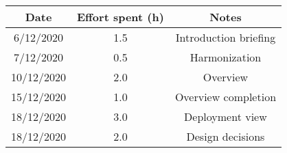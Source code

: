 \documentclass[../../main.tex]{subfiles}
\begin{document}
    \begin{center}
        \begin{tabular}{|c| |c| |c|} 
            \hline
            Date & Effort spent (h) & Notes\\ [0.5ex] 
            \hline\hline
            6/12/2020 & 1.5 & Introduction briefing\\ 
            7/12/2020 & 0.5 & Harmonization\\
            10/12/2020 & 2.0 & Overview\\
            15/12/2020 & 1.0 & Overview completion\\
            18/12/2020 & 3.0 & Deployment view\\
            18/12/2020 & 2.0 & Design decisions\\
            \hline
        \end{tabular}
    \end{center}
\end{document}
